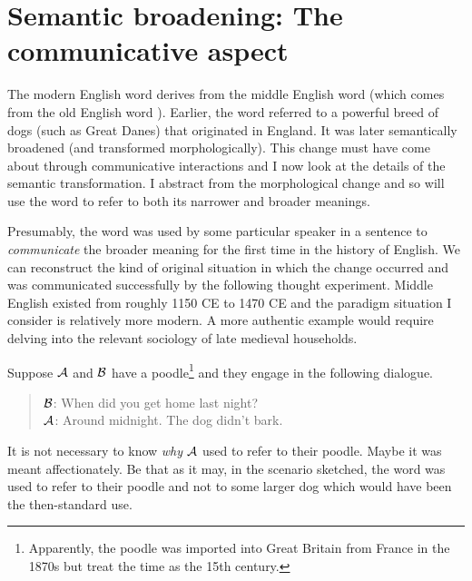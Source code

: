\section{Semantic broadening: The communicative aspect} \label{sec:Semantic Broadening: The Communicative Aspect}

The modern English word  derives from the middle English word  (which comes from the old English word ). Earlier, the word referred to a powerful breed of dogs (such as Great Danes) that originated in England. It was later semantically broadened (and transformed morphologically). This change must have come about through communicative interactions and I now look at the details of the semantic transformation. I abstract from the morphological change and so will use the word  to refer to both its narrower and broader meanings.


Presumably, the word was used by some particular speaker in a sentence to \emph{communicate} the broader meaning for the first time in the history of English. We can reconstruct the kind of original situation in which the change occurred and was communicated successfully by the following thought experiment. Middle English existed from roughly 1150 CE to 1470 CE and the paradigm situation I consider is relatively more modern. A more authentic example would require delving into the relevant sociology of late medieval households.

Suppose $\cal A$ and $\cal B$ have a poodle\footnote{Apparently, the poodle was imported into Great Britain from France in the 1870s but treat the time as the 15th century.} and they engage in the following dialogue.

\begin{quote}
$\cal B$: When did you get home last night?\\
$\cal A$: Around midnight. The dog didn't bark.
\end{quote}

It is not necessary to know \emph{why} $\cal A$ used  to refer to their poodle. Maybe it was meant affectionately. Be that as it may, in the scenario sketched, the word was used to refer to their poodle and not to some larger dog which would have been the then-standard use.

